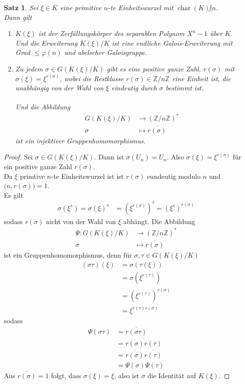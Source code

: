 \documentclass[10pt,a4paper]{article}
\newcommand{\Z}{\ensuremath{\mathbb{Z}}}
\newcommand{\ol}[1]{\overline{#1}}
\newcommand{\cha}{\operatorname{char}}
\theoremstyle{plain}
\newtheorem{satz}[theorem]{Satz}
\theoremstyle{definition}
\theoremstyle{remark}
\begin{document}
	\begin{satz}
		Sei $\xi\in\ol K$ eine primitive $n$-te Einheitswurzel mit $\cha(K)\not|n$.\\
		Dann gilt
		\begin{enumerate}
			\item $K(\xi)$ ist der Zerfällungskörper des separablen Polynom $X^n-1$ über $K$.\\
			Und die Erweiterung $K(\xi)/K$ ist eine endliche Galois-Erweiterung mit Grad $\leq\varphi(n)$ und abelscher Galoisgruppe.
			\item Zu jedem $\sigma\in G(K(\xi)/K)$ gibt es eine positive ganze Zahl, $r(\sigma)$ mit $\sigma(\xi)=\xi^{r(\sigma)}$, wobei die Restklasse $\ol{r(\sigma)}\in \Z/n\Z$ eine Einheit ist, die unabhängig von der Wahl von $\xi$ eindeutig durch $\sigma$ bestimmt ist.\\
			\\
			Und die Abbildung
			\begin{align*}
			G(K(\xi)/K)&\to(\Z/n\Z)^*\\
			\sigma&\mapsto\ol{r(\sigma)}
			\end{align*}
			ist ein injektiver Gruppenhomomorphismus.
		\end{enumerate}
	\end{satz}
	\begin{proof}
		\item Sei $\sigma\in G(K(\xi)/K)$. Dann ist $\sigma(U_n)=U_n$. Also $\sigma(\xi)=\xi^{r(\sigma)}$ für ein positive ganze Zahl $r(\sigma)$.\\
		Da $\xi$ primtive $n$-te Einheitswurzel ist ist $r(\sigma)$ eundeutig modulo $n$ und $\big(n,r(\sigma)\big)=1$.\\
		Es gilt
		\begin{align*}
		\sigma(\xi^s)=\sigma(\xi)^s&=(\xi^{r(\sigma)})^{s}=(\xi^s)^{r(\sigma)}
		\end{align*}
		sodass $r(\sigma)$ nicht von der Wahl von $\xi$ abhängt. Die Abbildung
		\begin{align*}
		\Psi:G(K(\xi)/K)&\to (\Z/n\Z)^*\\
		\sigma&\mapsto\ol{r(\sigma)}
		\end{align*}
		ist ein Gruppenhomomorphismus, denn für $\sigma,\tau \in G(K(\xi)/K)$
		\begin{align*}
		(\sigma\tau)(\xi)&=\sigma(\tau(\xi))\\
		&=\sigma(\xi^{r(\tau)})\\
		&=(\xi^{r(\tau)})^{r(\sigma)}\\
		&=\xi^{r(\tau)r(\sigma)}
		\end{align*}
		sodass
		\begin{align*}
		\Psi(\sigma\tau)&=\ol{r(\sigma\tau)}\\
		&=\ol{r(\sigma)r(\tau)}\\
		&=\ol{r(\sigma)}\ol{r(\tau)}\\
		&=\Psi(\sigma)\Psi(\tau)
		\end{align*}
		Aus $\ol{r(\sigma)}=1$ folgt, dass $\sigma(\xi)=\xi$, also ist $\sigma$ die Identität auf $K(\xi)$.
	\end{proof}
	
\end{document}
